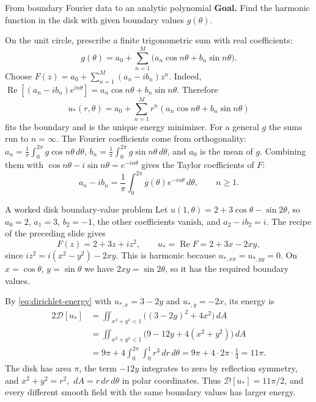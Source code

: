 \documentclass[11pt]{beamer}
\newcommand{\dd}{\,d}
\newcommand{\D}{\mathcal D}
\begin{document}
\begin{frame}{From boundary Fourier data to an analytic polynomial}
\small
\textbf{Goal.} Find the harmonic function in the disk with given boundary values $g(\theta)$.

On the unit circle, prescribe a finite trigonometric sum with real coefficients:
\[
 g(\theta)=a_0+\sum_{n=1}^M\bigl(a_n\cos n\theta+b_n\sin n\theta\bigr).
\]
Choose $F(z)=a_0+\sum_{n=1}^M(a_n-ib_n)z^n$.
Indeed, $\operatorname{Re}[(a_n-ib_n)e^{in\theta}]
=a_n\cos n\theta+b_n\sin n\theta$.
Therefore
\begin{equation}
 u_*(r,\theta)=a_0+\sum_{n=1}^Mr^n(a_n\cos n\theta+b_n\sin n\theta)
 \label{eq:disk-harmonic}
\end{equation}
fits the boundary and is the unique energy minimizer.
For a general \(g\) the sums run to \(n=\infty\). The Fourier coefficients come from orthogonality:
\(a_n=\frac1\pi\int_0^{2\pi}g\cos n\theta\,d\theta\), \(b_n=\frac1\pi\int_0^{2\pi}g\sin n\theta\,d\theta\), and \(a_0\) is the mean of \(g\). Combining
them with \(\cos n\theta-i\sin n\theta=e^{-in\theta}\) gives the Taylor coefficients of \(F\):
\[
 a_n-ib_n=\frac1\pi\int_0^{2\pi}g(\theta)e^{-in\theta}\dd\theta,
 \qquad n\ge1.
\]
\end{frame}

\begin{frame}[allowframebreaks=1.00]{A worked disk boundary-value problem}
\small
Let $u(1,\theta)=2+3\cos\theta-\sin2\theta$, so $a_0=2$, $a_1=3$, $b_2=-1$, the other
coefficients vanish, and $a_2-ib_2=i$. The recipe of the preceding slide gives
\[
 F(z)=2+3z+iz^2,\qquad
 u_*=\operatorname{Re}F=2+3x-2xy,
\]
since $iz^2=i(x^2-y^2)-2xy$. This is harmonic because $u_{*,xx}=u_{*,yy}=0$.
On $x=\cos\theta$, $y=\sin\theta$ we have $2xy=\sin2\theta$, so it has the required boundary values.


By \eqref{eq:dirichlet-energy} with $u_{*,x}=3-2y$ and $u_{*,y}=-2x$, its energy is
\begin{align*}
 2\D[u_*]
 &=\iint_{x^2+y^2<1}\bigl((3-2y)^2+4x^2\bigr)\dd A\\
 &=\iint_{x^2+y^2<1}\bigl(9-12y+4(x^2+y^2)\bigr)\dd A\\
 &=9\pi+4\int_0^{2\pi}\!\!\int_0^1r^3\dd r\dd\theta=9\pi+4\cdot2\pi\cdot\tfrac14=11\pi.
\end{align*}
The disk has area $\pi$, the term $-12y$ integrates to zero by reflection symmetry, and
$x^2+y^2=r^2$, $\dd A=r\dd r\dd\theta$ in polar coordinates. Thus $\D[u_*]=11\pi/2$, and every different
smooth field with the same boundary values has larger energy.
\end{frame}
\end{document}

